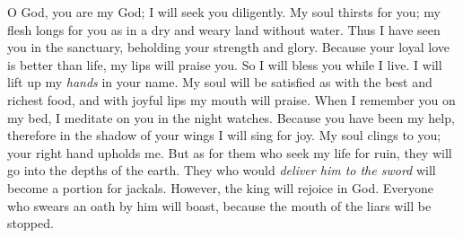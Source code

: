 \begin{biblechapter} %
 O God, you are my God; 
I will seek you diligently. 
My soul thirsts for you; my flesh longs for you 
as in a dry and weary land without water.
\verse Thus I have seen you in the sanctuary, 
beholding your strength and glory.
\verse Because your loyal love is better than life, 
my lips will praise you.
\verse So I will bless you while I live. 
I will lift up my \textit{hands} in your name.
\verse My soul will be satisfied as with the best and richest food, 
and with joyful lips my mouth will praise.
\verse When I remember you on my bed, 
I meditate on you in the night watches.
\verse Because you have been my help, 
therefore in the shadow of your wings I will sing for joy.
\verse My soul clings to you; 
your right hand upholds me.
\verse But as for them who seek my life for ruin, 
they will go into the depths of the earth.
\verse They who would \textit{deliver him to the sword} 
will become a portion for jackals.
\verse However, the king will rejoice in God. 
Everyone who swears an oath by him will boast, 
because the mouth of the liars will be stopped.
\end{biblechapter}

